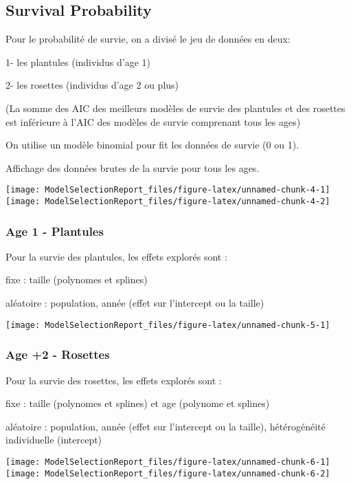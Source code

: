 \documentclass[
]{article}
\begin{document}
\subsection{Survival Probability}\label{survival-probability}

Pour le probabilité de survie, on a divisé le jeu de données en deux:

1- les plantules (individus d'age 1)

2- les rosettes (individus d'age 2 ou plus)

(La somme des AIC des meilleurs modèles de survie des plantules et des
rosettes est inférieure à l'AIC des modèles de survie comprenant tous
les ages)

On utilise un modèle binomial pour fit les données de survie (0 ou 1).

Affichage des données brutes de la survie pour tous les ages.

\texttt{[image: ModelSelectionReport\_files/figure-latex/unnamed-chunk-4-1]}
\texttt{[image: ModelSelectionReport\_files/figure-latex/unnamed-chunk-4-2]}

\subsubsection{Age 1 - Plantules}\label{age-1---plantules}

Pour la survie des plantules, les effets explorés sont :

fixe : taille (polynomes et splines)

aléatoire : population, année (effet sur l'intercept ou la taille)

\texttt{[image: ModelSelectionReport\_files/figure-latex/unnamed-chunk-5-1]}

\subsubsection{Age +2 - Rosettes}\label{age-2---rosettes}

Pour la survie des rosettes, les effets explorés sont :

fixe : taille (polynomes et splines) et age (polynome et splines)

aléatoire : population, année (effet sur l'intercept ou la taille),
hétérogénéité individuelle (intercept)

\texttt{[image: ModelSelectionReport\_files/figure-latex/unnamed-chunk-6-1]}
\texttt{[image: ModelSelectionReport\_files/figure-latex/unnamed-chunk-6-2]}
\end{document}
